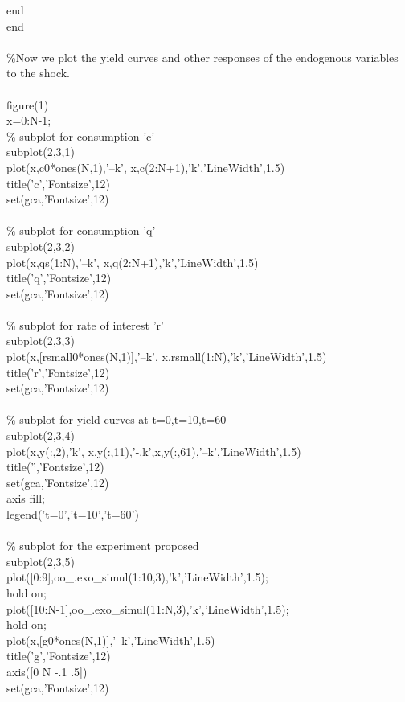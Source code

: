 \documentclass[a4paper,12pt]{scrartcl} %
\begin{document}
{end\\
end\\
\\
\%Now we plot the yield curves and other responses of the endogenous variables to the shock.\\
\\
figure(1)\\
x=0:N-1;\\
\% subplot for consumption 'c'\\
subplot(2,3,1)\\
plot(x,c0*ones(N,1),'--k', x,c(2:N+1),'k','LineWidth',1.5)\\
title('c','Fontsize',12)\\
set(gca,'Fontsize',12)\\
\\
\% subplot for consumption 'q'\\
subplot(2,3,2)\\
plot(x,qs(1:N),'--k', x,q(2:N+1),'k','LineWidth',1.5)\\
title('q','Fontsize',12)\\
set(gca,'Fontsize',12)\\
\\
\% subplot for rate of interest 'r'\\
subplot(2,3,3)\\
plot(x,[rsmall0*ones(N,1)],'--k', x,rsmall(1:N),'k','LineWidth',1.5)\\
title('r','Fontsize',12)\\
set(gca,'Fontsize',12)\\
\\
\% subplot for yield curves at t=0,t=10,t=60\\
subplot(2,3,4)\\
plot(x,y(:,2),'k', x,y(:,11),'-.k',x,y(:,61),'--k','LineWidth',1.5)\\
title('','Fontsize',12)\\
set(gca,'Fontsize',12)\\
axis fill;\\
legend('t=0','t=10','t=60')\\
\\
\% subplot for the experiment proposed\\
subplot(2,3,5)\\
plot([0:9],oo\_.exo\_simul(1:10,3),'k','LineWidth',1.5);\\
hold on;\\
plot([10:N-1],oo\_.exo\_simul(11:N,3),'k','LineWidth',1.5);\\
hold on;\\
plot(x,[g0*ones(N,1)],'--k','LineWidth',1.5)\\
title('g','Fontsize',12)\\
axis([0 N -.1 .5])\\
set(gca,'Fontsize',12)}\\
\end{document}
